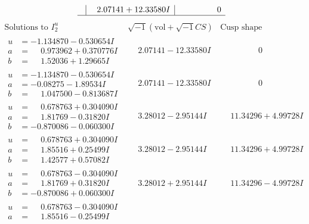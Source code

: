 \documentclass[1p]{elsarticle_modified}
\theoremstyle{definition}
\newcommand{\I}{\sqrt{-1}}
\begin{document}
$$\begin{array}{c|c|c}
 & \phantom{-}2.07141 + 12.33580 I & \phantom{-0.000000 } 0\\
 \hline 
 \end{array}$$\newpage$$\begin{array}{c|c|c}  
\text{Solutions to }I^u_{2}& \I (\text{vol} + \sqrt{-1}CS) & \text{Cusp shape}\\
 \hline 
\begin{aligned}
u &= -1.134870 - 0.530654 I \\
a &= \phantom{-}0.973962 + 0.370776 I \\
b &= \phantom{-}1.52036 + 1.29665 I\end{aligned}
 & \phantom{-}2.07141 - 12.33580 I & \phantom{-0.000000 } 0 \\ \hline\begin{aligned}
u &= -1.134870 - 0.530654 I \\
a &= -0.08275 - 1.89534 I \\
b &= \phantom{-}1.047500 - 0.813687 I\end{aligned}
 & \phantom{-}2.07141 - 12.33580 I & \phantom{-0.000000 } 0 \\ \hline\begin{aligned}
u &= \phantom{-}0.678763 + 0.304090 I \\
a &= \phantom{-}1.81769 - 0.31820 I \\
b &= -0.870086 - 0.060300 I\end{aligned}
 & \phantom{-}3.28012 - 2.95144 I & \phantom{-}11.34296 + 4.99728 I \\ \hline\begin{aligned}
u &= \phantom{-}0.678763 + 0.304090 I \\
a &= \phantom{-}1.85516 + 0.25499 I \\
b &= \phantom{-}1.42577 + 0.57082 I\end{aligned}
 & \phantom{-}3.28012 - 2.95144 I & \phantom{-}11.34296 + 4.99728 I \\ \hline\begin{aligned}
u &= \phantom{-}0.678763 - 0.304090 I \\
a &= \phantom{-}1.81769 + 0.31820 I \\
b &= -0.870086 + 0.060300 I\end{aligned}
 & \phantom{-}3.28012 + 2.95144 I & \phantom{-}11.34296 - 4.99728 I \\ \hline\begin{aligned}
u &= \phantom{-}0.678763 - 0.304090 I \\
a &= \phantom{-}1.85516 - 0.25499 I \\

\end{aligned}
\end{array}$$
\end{document}
